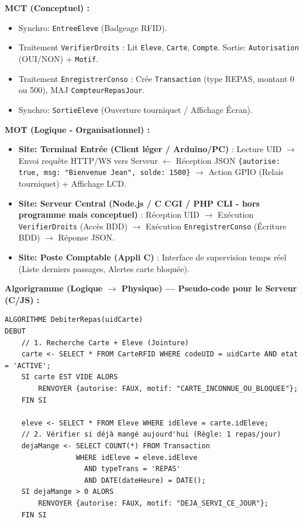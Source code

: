 \documentclass[11pt]{article}
\begin{document}
\begin{exemplebox}
\textbf{MCT (Conceptuel) :}
\begin{itemize}
    \item Synchro: \texttt{EntreeEleve} (Badgeage RFID).
    \item Traitement \texttt{VerifierDroits} : Lit \texttt{Eleve}, \texttt{Carte}, \texttt{Compte}. Sortie: \texttt{Autorisation} (OUI/NON) + \texttt{Motif}.
    \item Traitement \texttt{EnregistrerConso} : Crée \texttt{Transaction} (type REPAS, montant 0 ou 500), MAJ \texttt{CompteurRepasJour}.
    \item Synchro: \texttt{SortieEleve} (Ouverture tourniquet / Affichage Écran).
\end{itemize}

\textbf{MOT (Logique - Organisationnel) :}
\begin{itemize}
    \item \textbf{Site: Terminal Entrée (Client léger / Arduino/PC)} : Lecture UID $\rightarrow$ Envoi requête HTTP/WS vers Serveur $\leftarrow$ Réception JSON \texttt{\{autorise: true, msg: "Bienvenue Jean", solde: 1500\}} $\rightarrow$ Action GPIO (Relais tourniquet) + Affichage LCD.
    \item \textbf{Site: Serveur Central (Node.js / C CGI / PHP CLI - hors programme mais conceptuel)} : Réception UID $\rightarrow$ Exécution \texttt{VerifierDroits} (Accès BDD) $\rightarrow$ Exécution \texttt{EnregistrerConso} (Écriture BDD) $\rightarrow$ Réponse JSON.
    \item \textbf{Site: Poste Comptable (Appli C)} : Interface de supervision temps réel (Liste derniers passages, Alertes carte bloquée).
\end{itemize}

\textbf{Algorigramme (Logique $\rightarrow$ Physique) — Pseudo-code pour le Serveur (C/JS) :}
\begin{lstlisting}[basicstyle=\ttfamily\small]
ALGORITHME DebiterRepas(uidCarte)
DEBUT
    // 1. Recherche Carte + Eleve (Jointure)
    carte <- SELECT * FROM CarteRFID WHERE codeUID = uidCarte AND etat = 'ACTIVE';
    SI carte EST VIDE ALORS
        RENVOYER {autorise: FAUX, motif: "CARTE_INCONNUE_OU_BLOQUEE"};
    FIN SI

    eleve <- SELECT * FROM Eleve WHERE idEleve = carte.idEleve;
    // 2. Vérifier si déjà mangé aujourd'hui (Règle: 1 repas/jour)
    dejaMange <- SELECT COUNT(*) FROM Transaction
                 WHERE idEleve = eleve.idEleve
                   AND typeTrans = 'REPAS'
                   AND DATE(dateHeure) = DATE();
    SI dejaMange > 0 ALORS
        RENVOYER {autorise: FAUX, motif: "DEJA_SERVI_CE_JOUR"};
    FIN SI


\end{lstlisting}
\end{exemplebox}
\end{document}
